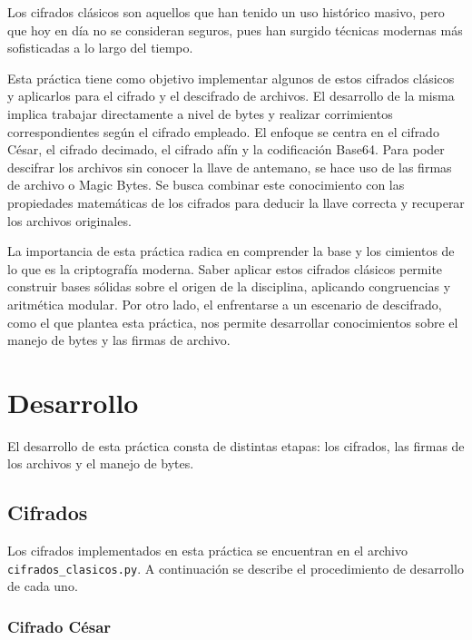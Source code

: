 \documentclass[12pt, a4paper]{article}
\begin{document}
Los cifrados clásicos son aquellos que han tenido un uso histórico masivo, pero que hoy en día no se consideran
seguros, pues han surgido técnicas modernas más sofisticadas a lo largo del tiempo.

Esta práctica tiene como objetivo implementar algunos de estos cifrados clásicos y aplicarlos para el cifrado y el
descifrado de archivos. El desarrollo de la misma implica trabajar directamente a nivel de bytes y realizar corrimientos correspondientes según el cifrado empleado. El enfoque se centra en el cifrado César, el cifrado
decimado, el cifrado afín y la codificación Base64. Para poder descifrar los archivos sin conocer
la llave de antemano, se hace uso de las firmas de archivo o Magic Bytes. Se busca combinar este conocimiento con las propiedades 
matemáticas de los cifrados para deducir la llave correcta y recuperar los archivos originales.

La importancia de esta práctica radica en comprender la base y los cimientos de lo que es la
criptografía moderna. Saber aplicar estos cifrados clásicos permite construir bases sólidas sobre el origen de la disciplina,
aplicando congruencias y aritmética modular. Por otro lado, el enfrentarse a un escenario de descifrado, como el que plantea 
esta práctica, nos permite desarrollar conocimientos sobre el manejo de bytes y las firmas de archivo.


\section{Desarrollo}

El desarrollo de esta práctica consta de distintas etapas: los cifrados, las firmas de los archivos y el manejo de bytes.

\subsection{Cifrados}

Los cifrados implementados en esta práctica se encuentran en el archivo \texttt{cifrados\_clasicos.py}.
A continuación se describe el procedimiento de desarrollo de cada uno.

\subsubsection*{Cifrado César}
\end{document}
